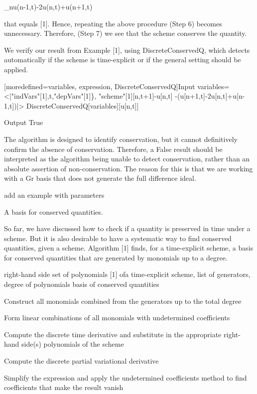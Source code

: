 \documentclass{article}
\begin{document}
{		_{n}u(n-1,t)-2u(n,t)+u(n+1,t)
	
	that equals [1].
	Hence, repeating the above procedure (Step 6) becomes unnecessary.
	Therefore, (Step 7) we see that the scheme conserves the quantity.


	We verify our result from Example [1], using {DiscreteConservedQ}, which detects automatically if the scheme is time-explicit or if
	 the general setting should be applied.
	
	
		[moredefined={variables, expression, DiscreteConservedQ}]{Input}
  variables=<|"indVars"[1],t,"depVars"[1]\},
  "scheme"[1][n,t+1]-u[n,t]
  -(u[n+1,t]-2u[n,t]+u[n-1,t])|>
  DiscreteConservedQ[variables][u[n,t]]
  

		{Output}
  True

	


The algorithm is designed to identify conservation, but it cannot definitively confirm the absence of conservation. Therefore, a {False} result should be interpreted as the algorithm being unable to detect conservation, rather than an absolute assertion of non-conservation. The reason for this is that we are working with a Gr basis that does not generate the full difference ideal. 


{  add an example with parameters}


A basis for conserved quantities.



So far, we have discussed how to check if a quantity is preserved in time under a scheme. But it is also desirable to have a systematic way to find conserved quantities, given a scheme.
Algorithm [1] finds, for a time-explicit scheme, a basis for conserved quantities that are generated by monomials up to a degree. 

	
	{right-hand side set of polynomials [1] ofa time-explicit scheme, list of {generators}, {degree} of polynomials }
	{basis of conserved quantities}
	
	 Construct all monomials combined from the {generators} up to the total {degree}
	
	 Form linear combinations of all monomials with undetermined coefficients
	
	 Compute the discrete time derivative and substitute in the appropriate right-hand side(s) polynomials of the scheme
	
	Compute the discrete partial variational derivative
	
	 Simplify the expression and apply the undetermined coefficients method to find coefficients that make the result vanish
	
}
\end{document}

